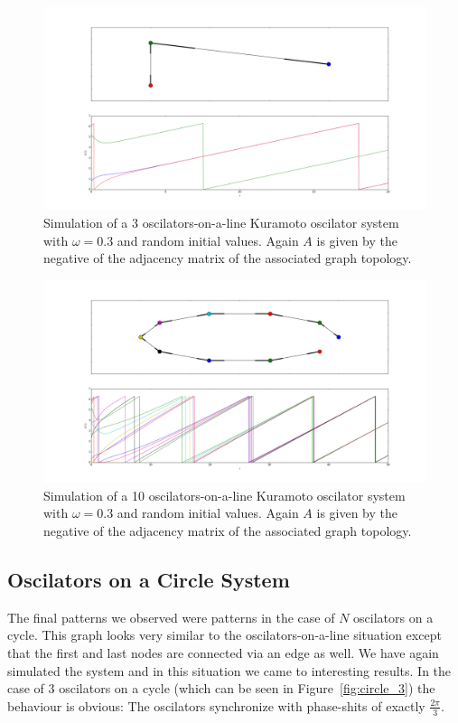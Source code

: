 \begin{figure}[h]
  \centering
  \includegraphics[width=\textwidth]{imgs/line_3}
  \caption{Simulation of a 3 oscilators-on-a-line Kuramoto oscilator system with $\omega = 0.3$ and random initial values. Again $A$ is given by the negative of the adjacency matrix of the associated graph topology. }
  \label{fig:line_3}
\end{figure}

\begin{figure}[h]
  \centering
  \includegraphics[width=\textwidth]{imgs/line_10}
  \caption{Simulation of a 10 oscilators-on-a-line Kuramoto oscilator system with $\omega = 0.3$ and random initial values. Again $A$ is given by the negative of the adjacency matrix of the associated graph topology. }
  \label{fig:line_10}
\end{figure}

\subsection{Oscilators on a Circle System}

The final patterns we observed were patterns in the case of $N$ oscilators on a cycle. This graph looks very similar to the oscilators-on-a-line situation except that the first and last nodes are connected via an edge as well. We have again simulated the system and in this situation we came to interesting results. In the case of $3$ oscilators on a cycle (which can be seen in Figure~\ref{fig:circle_3}) the behaviour is obvious: The oscilators synchronize with phase-shits of exactly $\frac{2 \pi}{3}$. 

